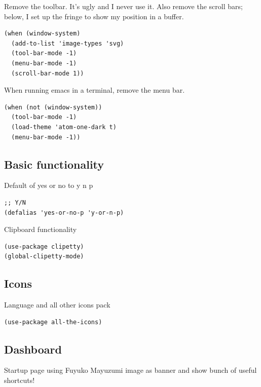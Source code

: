 \documentclass[11pt]{article}
\begin{document}
Remove the toolbar. It's ugly and I never use it. Also remove the
scroll bars; below, I set up the fringe to show my position in a
buffer.

\begin{verbatim}
(when (window-system)
  (add-to-list 'image-types 'svg)
  (tool-bar-mode -1)
  (menu-bar-mode -1)
  (scroll-bar-mode 1))
\end{verbatim}

When running emacs in a terminal, remove the menu bar.

\begin{verbatim}
(when (not (window-system))
  (tool-bar-mode -1)
  (load-theme 'atom-one-dark t)
  (menu-bar-mode -1))
\end{verbatim}

\subsection{Basic functionality}
\label{sec:orgc2eab3f}

Default of yes or no to y n p
\begin{verbatim}
;; Y/N
(defalias 'yes-or-no-p 'y-or-n-p)
\end{verbatim}

Clipboard functionality
\begin{verbatim}
(use-package clipetty)
(global-clipetty-mode)
\end{verbatim}

\subsection{Icons}
\label{sec:org610a175}

Language and all other icons pack

\begin{verbatim}
(use-package all-the-icons)
\end{verbatim}

\subsection{Dashboard}
\label{sec:org8b840b1}

Startup page using Fuyuko Mayuzumi image as banner and show bunch of useful shortcuts!
\end{document}
